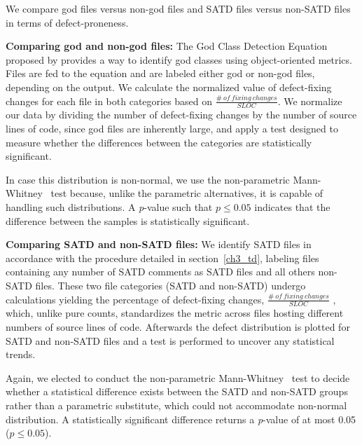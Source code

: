 We compare god files versus non-god files and SATD files versus non-SATD files in terms of defect-proneness.


\noindent\textbf{Comparing god and non-god files:}
The God Class Detection Equation proposed by \cite{marinescu2004detection} provides a way to identify god classes using object-oriented metrics. Files are fed to the equation and are labeled either god or non-god files, depending on the output. We calculate the normalized value of defect-fixing changes for each file in both categories based on $\frac{ \#~of~fixing~changes}{SLOC}$. We normalize our data by dividing the number of defect-fixing changes by the number of source lines of code, since god files are inherently large, and apply a test designed to measure whether the differences between the categories are statistically significant.

In case this distribution is non-normal, we use the non-parametric Mann-Whitney~\cite{mann1947test} test because, unlike the parametric alternatives, it is capable of handling such distributions. A \textit{p}-value such that $p \le 0.05$ indicates that the difference between the samples is statistically significant.


\noindent\textbf{Comparing SATD and non-SATD files:}
We identify SATD files in accordance with the procedure detailed in section~\ref{ch3_td}, labeling files containing any number of SATD comments as SATD files and all others non-SATD files. These two file categories (SATD and non-SATD) undergo calculations yielding the percentage of defect-fixing changes, $\frac{ \#~of~fixing~changes}{SLOC}$ , which, unlike pure counts, standardizes the metric across files hosting different numbers of source lines of code. Afterwards the defect distribution is plotted for SATD and non-SATD files and a test is performed to uncover any statistical trends.

Again, we elected to conduct the non-parametric Mann-Whitney~\cite{mann1947test} test to decide whether a statistical difference exists between the SATD and non-SATD groups rather than a parametric substitute, which could not accommodate non-normal distribution. A statistically significant difference returns a \textit{p}-value of at most 0.05 ($p \le 0.05$).




